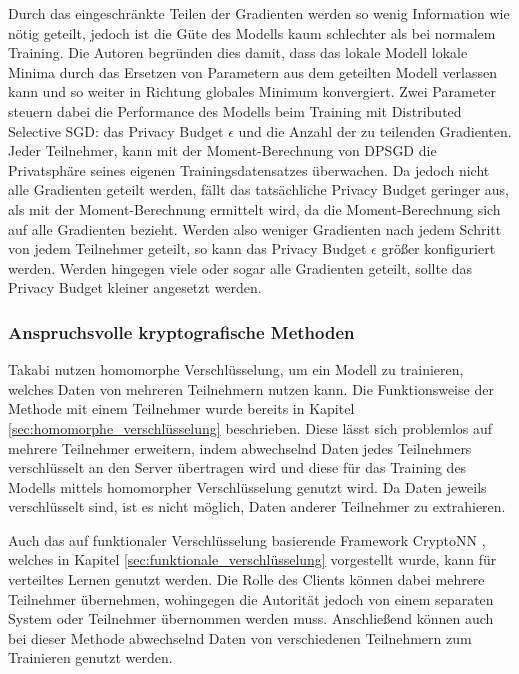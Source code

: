 
Durch das eingeschränkte Teilen der Gradienten werden so wenig Information wie nötig geteilt, jedoch ist die Güte des Modells kaum schlechter als bei normalem Training.
Die Autoren begründen dies damit, dass das lokale Modell lokale Minima durch das Ersetzen von Parametern aus dem geteilten Modell verlassen kann und so weiter in Richtung globales Minimum konvergiert. 
Zwei Parameter steuern dabei die Performance des Modells beim Training mit Distributed Selective SGD: das Privacy Budget $\epsilon$ und die Anzahl der zu teilenden Gradienten.
Jeder Teilnehmer, kann mit der Moment-Berechnung von DPSGD \cite{P-28} die Privatsphäre seines eigenen Trainingsdatensatzes überwachen.
Da jedoch nicht alle Gradienten geteilt werden, fällt das tatsächliche Privacy Budget geringer aus, als mit der Moment-Berechnung ermittelt wird, da die Moment-Berechnung sich auf alle Gradienten bezieht.
Werden also weniger Gradienten nach jedem Schritt von jedem Teilnehmer geteilt, so kann das Privacy Budget $\epsilon$ größer konfiguriert werden.
Werden hingegen viele oder sogar alle Gradienten geteilt, sollte das Privacy Budget kleiner angesetzt werden.

\subsubsection*{Anspruchsvolle kryptografische Methoden}

Takabi \etal \cite{P-104} nutzen homomorphe Verschlüsselung, um ein Modell zu trainieren, welches Daten von mehreren Teilnehmern nutzen kann. 
Die Funktionsweise der Methode mit einem Teilnehmer wurde bereits in Kapitel \ref{sec:homomorphe_verschlüsselung} beschrieben.
Diese lässt sich problemlos auf mehrere Teilnehmer erweitern, indem abwechselnd Daten jedes Teilnehmers verschlüsselt an den Server übertragen wird und diese für das Training des Modells mittels homomorpher Verschlüsselung genutzt wird.
Da Daten jeweils verschlüsselt sind, ist es nicht möglich, Daten anderer Teilnehmer zu extrahieren.

Auch das auf funktionaler Verschlüsselung basierende Framework CryptoNN \cite{P-53}, welches in Kapitel \ref{sec:funktionale_verschlüsselung} vorgestellt wurde, kann für verteiltes Lernen genutzt werden. 
Die Rolle des Clients können dabei mehrere Teilnehmer übernehmen, wohingegen die Autorität jedoch von einem separaten System oder Teilnehmer übernommen werden muss. 
Anschließend können auch bei dieser Methode abwechselnd Daten von verschiedenen Teilnehmern zum Trainieren genutzt werden.

